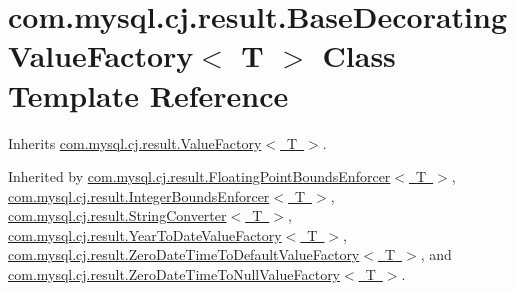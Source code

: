 \hypertarget{classcom_1_1mysql_1_1cj_1_1result_1_1_base_decorating_value_factory}{}\section{com.\+mysql.\+cj.\+result.\+Base\+Decorating\+Value\+Factory$<$ T $>$ Class Template Reference}
\label{classcom_1_1mysql_1_1cj_1_1result_1_1_base_decorating_value_factory}


Inherits \mbox{\hyperlink{interfacecom_1_1mysql_1_1cj_1_1result_1_1_value_factory}{com.\+mysql.\+cj.\+result.\+Value\+Factory$<$ T $>$}}.



Inherited by \mbox{\hyperlink{classcom_1_1mysql_1_1cj_1_1result_1_1_floating_point_bounds_enforcer}{com.\+mysql.\+cj.\+result.\+Floating\+Point\+Bounds\+Enforcer$<$ T $>$}}, \mbox{\hyperlink{classcom_1_1mysql_1_1cj_1_1result_1_1_integer_bounds_enforcer}{com.\+mysql.\+cj.\+result.\+Integer\+Bounds\+Enforcer$<$ T $>$}}, \mbox{\hyperlink{classcom_1_1mysql_1_1cj_1_1result_1_1_string_converter}{com.\+mysql.\+cj.\+result.\+String\+Converter$<$ T $>$}}, \mbox{\hyperlink{classcom_1_1mysql_1_1cj_1_1result_1_1_year_to_date_value_factory}{com.\+mysql.\+cj.\+result.\+Year\+To\+Date\+Value\+Factory$<$ T $>$}}, \mbox{\hyperlink{classcom_1_1mysql_1_1cj_1_1result_1_1_zero_date_time_to_default_value_factory}{com.\+mysql.\+cj.\+result.\+Zero\+Date\+Time\+To\+Default\+Value\+Factory$<$ T $>$}}, and \mbox{\hyperlink{classcom_1_1mysql_1_1cj_1_1result_1_1_zero_date_time_to_null_value_factory}{com.\+mysql.\+cj.\+result.\+Zero\+Date\+Time\+To\+Null\+Value\+Factory$<$ T $>$}}.

